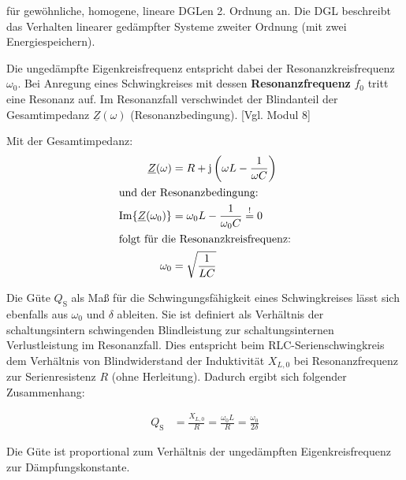 \begin{frame}[t]
{    für gewöhnliche, homogene, lineare DGLen 2. Ordnung an.
    Die DGL beschreibt das Verhalten linearer gedämpfter Systeme zweiter Ordnung (mit zwei Energiespeichern).%

    Die ungedämpfte Eigenkreisfrequenz entspricht dabei der Resonanzkreisfrequenz $\omega_0$.
    Bei Anregung eines Schwingkreises mit dessen \textbf{Resonanzfrequenz} $f_0$ tritt eine Resonanz auf.
    Im Resonanzfall verschwindet der Blindanteil der Gesamtimpedanz $\underline{Z}(\omega)$ (Resonanzbedingung). [Vgl. Modul 8]

    Mit der Gesamtimpedanz:
    \begin{align}
            \underline{Z}(\omega) &= R + \mathrm{j} \left( \omega L - \frac{1}{\omega C} \right) \nonumber\\
        \intertext{und der Resonanzbedingung:}
            \Im\{\underline{Z}(\omega_0)\} &= \omega_0 L - \frac{1}{\omega_0 C} \overset{!}{=} 0 \nonumber\\
        \intertext{folgt für die Resonanzkreisfrequenz:}
            \omega_0 &= \sqrt{\frac{1}{LC}} \label{eq:dgl:rlc:resonanzkreisfrequenz}
    \end{align}

    Die Güte $Q_{\mathrm{S}}$ als Maß für die Schwingungsfähigkeit eines Schwingkreises lässt sich ebenfalls aus $\omega_0$ und $\delta$ ableiten.
    Sie ist definiert als Verhältnis der schaltungsintern schwingenden Blindleistung
    zur schaltungsinternen Verlustleistung im Resonanzfall. Dies entspricht beim RLC-Serienschwingkreis dem Verhältnis von
    Blindwiderstand der Induktivität $X_{L,0}$ bei Resonanzfrequenz zur Serienresistenz $R$ (ohne Herleitung).
    Dadurch ergibt sich folgender Zusammenhang:

    \begin{align}
        Q_{\mathrm{S}} &= \frac{X_{L,0}}{R} = \frac{\omega_0 L}{R} = \frac{\omega_0}{2\delta} \label{eq:dgl:rlc:guete}
    \end{align}

    Die Güte ist proportional zum Verhältnis der ungedämpften Eigenkreisfrequenz zur Dämpfungskonstante. %

}
\end{frame}
